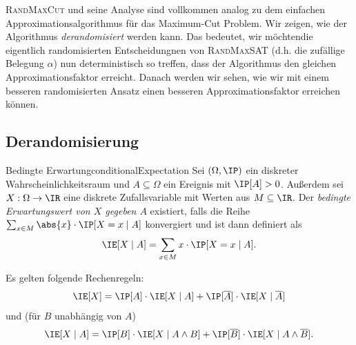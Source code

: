 \documentclass[language=ngerman,algolist]{TemplateLecture}
\begin{document}
\textsc{RandMaxCut} und seine Analyse sind vollkommen analog zu dem einfachen Approximationsalgorithmus für das Maximum-Cut Problem. Wir zeigen, wie der Algorithmus \emph{derandomisiert} werden kann. Das bedeutet, wir möchtendie eigentlich randomisierten Entscheidungnen von \textsc{RandMaxSAT} (d.h. die zufällige Belegung $\alpha$) nun deterministisch so treffen, dass der Algorithmus den gleichen Approximationsfaktor erreicht. Danach werden wir sehen, wie wir mit einem besseren randomisierten Ansatz einen besseren Approximationsfaktor erreichen können.

\subsection{Derandomisierung}

\begin{defi}{Bedingte Erwartung}{conditionalExpectation}
    Sei $(\Omega, \IP)$ ein diskreter Wahrscheinlichkeitsraum und $A \subseteq \Omega$ ein Ereignis mit $\IP[A] > 0$. Außerdem sei $X: \Omega \to \IR$ eine diskrete Zufallsvariable mit Werten aus $M \subseteq \IR$. Der \emph{bedingte Erwartungswert von $X$ gegeben $A$} existiert, falls die Reihe $\sum_{x \in M} \abs{x} \cdot \IP[X = x \mid A]$ konvergiert und ist dann definiert als 
    \begin{equation*}
        \IE[X \mid A] = \sum_{x \in M} x \cdot \IP[X = x \mid A].
    \end{equation*}
\end{defi}
Es gelten folgende Rechenregeln:
\begin{equation}
    \IE[X] = \IP[A] \cdot \IE[X \mid A] + \IP[\overline{A}] \cdot \IE[X \mid \overline{A}] \label{eq:bayesCondExp}
\end{equation}
und (für $B$ unabhängig von $A$)
\begin{equation}
    \IE[X \mid A] = \IP[B] \cdot \IE[X \mid A \land B] + \IP[\overline{B}] \cdot \IE[X \mid A \land \overline{B}]. \label{eq:bayesCondExpIndep}
\end{equation}
\end{document}
